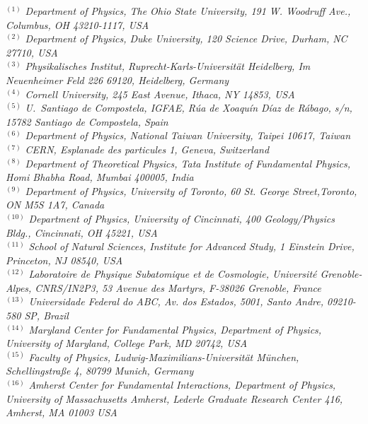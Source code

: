 {\footnotesize
\begin{center}
$^{(1)}$ \emph{Department of Physics, The Ohio State University, 191 W. Woodruff Ave., Columbus, OH 43210-1117, USA}\\
$^{(2)}$ \emph{Department of Physics, Duke University, 120 Science Drive, Durham, NC 27710, USA}\\
$^{(3)}$ \emph{Physikalisches Institut, Ruprecht-Karls-Universit\"at Heidelberg, Im Neuenheimer Feld 226 69120, Heidelberg, Germany}\\
$^{(4)}$ \emph{Cornell University, 245 East Avenue, Ithaca, NY 14853, USA}\\
$^{(5)}$ \emph{U.~Santiago de Compostela, IGFAE, R\'ua de Xoaqu\'in D\'iaz de R\'abago, s/n, 15782 Santiago de Compostela, Spain}\\
$^{(6)}$ \emph{Department of Physics, National Taiwan University, Taipei 10617, Taiwan}\\
$^{(7)}$ \emph{CERN, Esplanade des particules 1, Geneva,  Switzerland}\\
$^{(8)}$ \emph{Department of Theoretical Physics, Tata Institute of Fundamental Physics,  Homi Bhabha Road, Mumbai 400005, India}\\
$^{(9)}$ \emph{Department of Physics, University of Toronto, 60 St. George Street,Toronto, ON M5S 1A7, Canada}\\
$^{(10)}$ \emph{Department of Physics, University of Cincinnati, 400 Geology/Physics Bldg., Cincinnati, OH 45221, USA}\\
$^{(11)}$ \emph{School of Natural Sciences, Institute for Advanced Study, 1 Einstein Drive, Princeton, NJ 08540, USA}\\
$^{(12)}$ \emph{Laboratoire de Physique Subatomique et de Cosmologie, Universit\'e   Grenoble-Alpes, CNRS/IN2P3, 53 Avenue des Martyrs, F-38026 Grenoble, France}\\
$^{(13)}$ \emph{Universidade Federal do ABC, Av. dos Estados, 5001, Santo Andre, 09210-580 SP, Brazil}\\
$^{(14)}$ \emph{Maryland Center for Fundamental Physics,  Department of Physics, University of Maryland, College Park, MD 20742, USA}\\
$^{(15)}$ \emph{Faculty of Physics, Ludwig-Maximilians-Universit\"at M\"unchen, Schellingstra\ss e 4, 80799 Munich, Germany}\\
$^{(16)}$ \emph{Amherst Center for Fundamental Interactions, Department of Physics, University of Massachusetts Amherst, Lederle Graduate Research Center 416, Amherst, MA 01003 USA}\\

\end{center}}
